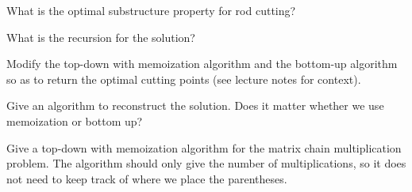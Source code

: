 
\question What is the optimal substructure property for rod cutting?

\question What is the recursion for the solution?

\question Modify the top-down with memoization algorithm and the bottom-up algorithm so as to return the optimal cutting points (see lecture notes for context).

\question Give an algorithm to reconstruct the solution. Does it matter whether we use memoization or bottom up?

\question Give a top-down with memoization algorithm for the matrix chain multiplication problem.
The algorithm should only give the number of multiplications, so it does not need to keep track of where we place the parentheses.

